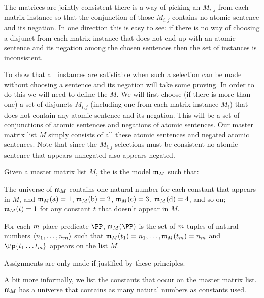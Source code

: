 The matrices are jointly consistent \Iff there is a way of picking an $M_{i,j}$ from each matrix instance so that the conjunction of those $M_{i,j}$ contains no atomic sentence and its negation. 
In one direction this is easy to see: if there is no way of choosing a disjunct from each matrix instance that does not end up with an atomic sentence and its negation among the chosen sentences then the set of instances is inconsistent. 

To show that all instances are satisfiable when such a selection can be made without choosing a sentence and its negation will take some proving.
In order to do this we will need to define the  $M$. 
We will first choose (if there is more than one) a set of disjuncts $M_{i,j}$ (including one from each matrix instance $M_i$) that does not contain any atomic sentence and its negation.
This will be a set of conjunctions of atomic sentences and negations of atomic sentences.
Our master matrix list $M$ simply consists of all these atomic sentences and negated atomic sentences.
Note that since the $M_{i,j}$ selections must be consistent no atomic sentence that appears unnegated also appears negated.
\begin{majorILnc}{}
Given a master matrix list $M$, the  is the model $\mathfrak{m}_M$ such that:
\begin{cenumerate}
\item The universe of $\mathfrak{m}_M$ contains one natural number for each constant that appears in $M$, and $\mathfrak{m}_M(\mathrm{a})=1$, $\mathfrak{m}_M(\mathrm{b})=2$, $\mathfrak{m}_M(\mathrm{c})=3$, $\mathfrak{m}_M(\mathrm{d})=4$, and so on; $\mathfrak{m}_M(t)=1$ for any constant $t$ that doesn't appear in $M$. 
\item For each $m$-place predicate $\PP$, $\IntA_M(\PP)$ is the set of $m$-tuples of natural numbers $\langle n_1,\ldots,n_m\rangle$ such that $\mathfrak{m}_M(t_1)=n_1,\ldots,\mathfrak{m}_M(t_m)=n_m$ and $\Pp{\variable{t}_1\ldots\variable{t}_\integer{m}}$ appears on the list $M$.
\item Assignments are only made if justified by these principles.
\end{cenumerate}
\end{majorILnc}
A bit more informally, we list the constants that occur on the master matrix list. $\mathfrak{m}_M$ has a universe that contains as many natural numbers as constants used.
